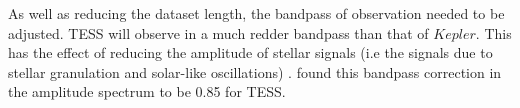 \documentclass[a4paper,fleqn,usenatbib,useAMS]{mnras}
\newcommand{\kep}{\ensuremath{Kepler}\:}
\begin{document}

As well as reducing the dataset length, the bandpass of observation needed to be adjusted. TESS will observe in a much redder bandpass than that of \kep. This has the effect of reducing the amplitude of stellar signals (i.e the signals due to stellar granulation and solar-like oscillations) \citep{ballot_visibilities_2011}. \citet{campante_asteroseismic_2016} found this bandpass correction in the amplitude spectrum to be 0.85 for TESS.
\end{document}

